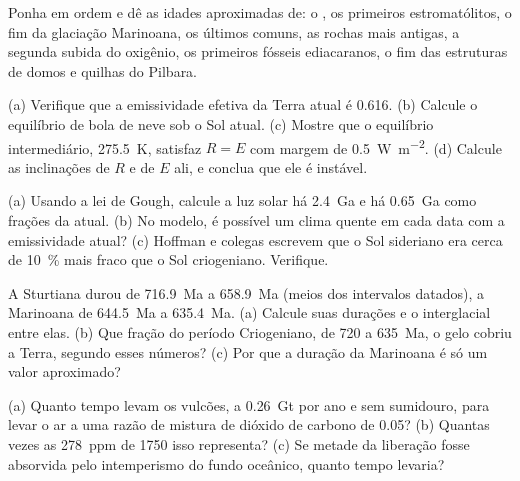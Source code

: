 \begin{exercise}[$\star$]\label{exo:b2:precambrian-earth:4}
Ponha em ordem e dê as idades aproximadas de: o , os
primeiros estromatólitos, o fim da glaciação Marinoana, os últimos  comuns, as
rochas mais antigas, a segunda subida do oxigênio, os primeiros fósseis ediacaranos, o fim das estruturas
de domos e quilhas do Pilbara.
\end{exercise}

\begin{exercise}[$\star\star$]\label{exo:b2:precambrian-earth:5}
(a) Verifique que a emissividade efetiva da Terra atual é 0.616. (b) Calcule o equilíbrio de
bola de neve sob o Sol atual. (c) Mostre que o equilíbrio intermediário, \qty{275.5}{K}, satisfaz
$R = E$ com margem de \qty{0.5}{W.m^{-2}}. (d) Calcule as inclinações de $R$ e de $E$ ali, e conclua
que ele é instável.
\end{exercise}

\begin{exercise}[$\star\star$]\label{exo:b2:precambrian-earth:6}
(a) Usando a lei de Gough, calcule a luz solar há \qty{2.4}{Ga} e há \qty{0.65}{Ga} como frações
da atual. (b) No modelo, é possível um clima quente em cada data com a emissividade atual?
(c) Hoffman e colegas escrevem que o Sol sideriano era cerca de \qty{10}{\percent} mais fraco que
o Sol criogeniano. Verifique.
\end{exercise}

\begin{exercise}[$\star\star$]\label{exo:b2:precambrian-earth:7}
A Sturtiana durou de \qty{716.9}{Ma} a \qty{658.9}{Ma} (meios dos intervalos datados),
a Marinoana de \qty{644.5}{Ma} a \qty{635.4}{Ma}. (a) Calcule suas durações e o
interglacial entre elas. (b) Que fração do período Criogeniano, de 720 a \qty{635}{Ma},
o gelo cobriu a Terra, segundo esses números? (c) Por que a duração da Marinoana é só um
valor aproximado?
\end{exercise}

\begin{exercise}[$\star\star$]\label{exo:b2:precambrian-earth:8}
(a) Quanto tempo levam os vulcões, a \qty{0.26}{Gt} por ano e sem sumidouro, para levar o ar a
uma razão de mistura de dióxido de carbono de 0.05? (b) Quantas vezes as \qty{278}{ppm} de 1750 isso representa? (c) Se metade da liberação fosse absorvida pelo intemperismo do fundo
oceânico, quanto tempo levaria?
\end{exercise}

